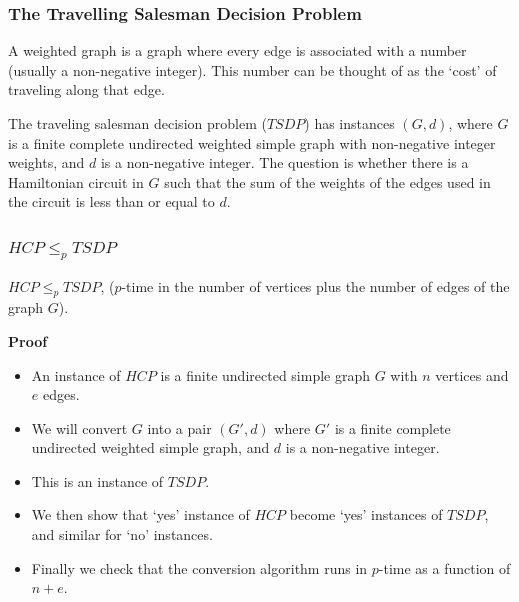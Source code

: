 \documentclass[handout]{beamer}
\begin{document}
\begin{frame}
\frametitle{The Travelling Salesman Decision Problem}
\begin{definition}
A weighted graph is a graph where every edge is associated with a number (usually a non-negative integer). This number can be thought of as the `cost' of traveling along that edge.
\end{definition}

\begin{definition}[$TSDP$]
The traveling salesman decision problem ($TSDP$) has instances $(G,d)$, where $G$ is a finite complete undirected weighted simple graph with non-negative integer weights, and $d$ is a non-negative integer. The question is whether there is a Hamiltonian circuit in $G$ such that the sum of the weights of the edges used in the circuit is less than or equal to $d$. 
\end{definition}

\end{frame}

\begin{frame}
\frametitle{$HCP\leq_p TSDP$}
\begin{theorem}
$HCP\leq_p TSDP$, ($p$-time in the number of vertices plus the number of edges of the graph $G$).
\end{theorem}
\textbf{Proof}
\begin{itemize}
\item An instance of $HCP$ is a finite undirected simple graph $G$ with $n$ vertices and $e$ edges. 
\item We will convert $G$ into a pair $(G',d)$ where $G'$ is a finite complete undirected weighted simple graph, and $d$ is a non-negative integer. 
\item This is an instance of $TSDP$. 
\item We then show that `yes' instance of $HCP$ become `yes' instances of $TSDP$, and similar for `no' instances. 
\item Finally we check that the conversion algorithm runs in $p$-time as a function of $n+e$.
\end{itemize} 

\end{frame}
\end{document}
